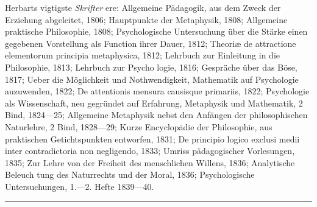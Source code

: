 \documentclass[12pt,a4paper]{book}
\newcommand{\divrule}{\begin{center}\rule{2cm}{0.4pt}\end{center}}
\begin{document}
Herbarts vigtigste \emph{Skrifter} ere: Allgemeine Pädagogik,
aus dem Zweck der Erziehung abgeleitet, 1806; Hauptpunkte
der Metaphysik, 1808; Allgemeine praktische Philosophie, 1808;
Psychologische Untersuchung über die Stärke einen gegebenen
Vorstellung als Function ihrer Dauer, 1812; Theoriæ de
attractione elementorum principia metaphysica, 1812; Lehrbuch
zur Einleitung in die Philosophie, 1813; Lehrbuch zur Psycho\-%
logie, 1816; Gespräche über das Böse, 1817; Ueber die
Möglichkeit und Nothwendigkeit, Mathematik auf Psychologie
auzuwenden, 1822; De attentionis mensura causisque primariis,
1822; Psychologie als Wissenschaft, neu gegründet auf Erfahrung,
Metaphysik und Mathematik, 2 Bind, 1824---25; Allgemeine
Metaphysik nebst den Anfängen der philosophischen Naturlehre,
2 Bind, 1828---29; Kurze Encyclopädie der Philosophie, aus
praktischen Getichtspunkten entworfen, 1831; De principio
logico exclusi medii inter contradictoria non negligendo, 1833;
Umriss pädagogischer Vorlesungen, 1835; Zur Lehre von der
Freiheit des menschlichen Willens, 1836; Analytische Beleuch\-%
tung des Naturrechts und der Moral, 1836; Psychologische
Untersuchungen, 1.---2. Hefte 1839---40.

\divrule
\end{document}
